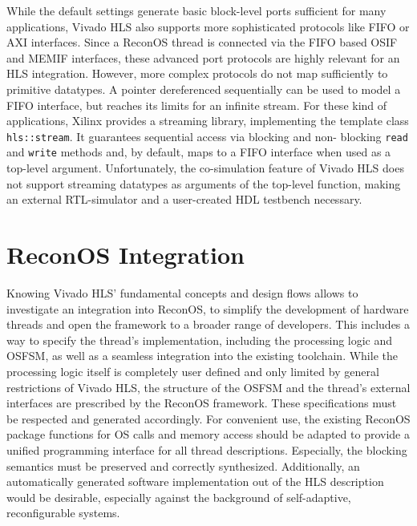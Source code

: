 While the default settings generate basic block-level ports sufficient for
many applications, Vivado HLS also supports more sophisticated protocols like
\ac{FIFO} or \ac{AXI} interfaces. Since a ReconOS thread is connected via
the \ac{FIFO} based \ac{OSIF} and \ac{MEMIF} interfaces, these advanced port
protocols are highly relevant for an \ac{HLS} integration. However, more
complex protocols do not map sufficiently to primitive datatypes. A pointer
dereferenced sequentially can be used to model a \ac{FIFO} interface, but
reaches its limits for an infinite stream. For these kind of applications,
Xilinx provides a streaming library, implementing the template class
\lstinline{hls::stream}. It guarantees sequential access via blocking and non-
blocking \lstinline{read} and \lstinline{write} methods and, by default, maps
to a \ac{FIFO} interface when used as a top-level argument. Unfortunately, the
co-simulation feature of Vivado HLS does not support streaming datatypes as
arguments of the top-level function, making an external \ac{RTL}-simulator and
a user-created \ac{HDL} testbench necessary.

\section{ReconOS Integration}
Knowing Vivado HLS' fundamental concepts and design flows allows to
investigate an integration into ReconOS, to simplify the development of
hardware threads and open the framework to a broader range of developers. This
includes a way to specify the thread's implementation, including the
processing logic and \ac{OSFSM}, as well as a seamless integration into the
existing toolchain. While the processing logic itself is completely user
defined and only limited by general restrictions of Vivado HLS, the structure
of the \ac{OSFSM} and the thread's external interfaces are prescribed by the
ReconOS framework. These specifications must be respected and generated
accordingly. For convenient use, the existing ReconOS package functions for
\ac{OS} calls and memory access should be adapted to provide a unified
programming interface for all thread descriptions. Especially, the blocking
semantics must be preserved and correctly synthesized. Additionally, an
automatically generated software implementation out of the \ac{HLS}
description would be desirable, especially against the background of
self-adaptive, reconfigurable systems.


